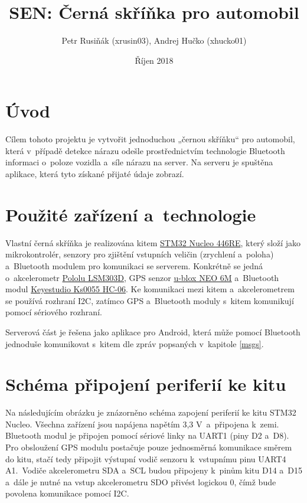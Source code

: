 \documentclass[a4paper,11pt,titlepage]{article}
\title{\textbf{SEN: Černá skříňka pro automobil}}
\author{Petr Rusiňák (xrusin03), Andrej Hučko (xhucko01)}
\date{Říjen 2018}
\begin{document}
\maketitle


\section{Úvod}

Cílem tohoto projektu je vytvořit jednoduchou „černou skříňku“ pro automobil, která
v~případě detekce nárazu odešle prostřednictvím technologie Bluetooth informaci o~poloze vozidla
a~síle nárazu na server. Na serveru je spuštěna aplikace, která tyto získané přijaté údaje
zobrazí.

\section{Použité zařízení a~technologie}

Vlastní černá skříňka je realizována kitem \href{https://www.st.com/en/evaluation-tools/nucleo-f446re.html}{STM32 Nucleo 446RE}, který složí jako mikrokontrolér,
senzory pro zjištění vstupních veličin (zrychlení a~poloha) a~Bluetooth modulem pro komunikaci se serverem.
Konkrétně se jedná o~akcelerometr
\href{https://www.pololu.com/product/2127}{Pololu LSM303D}, GPS senzor \href{https://www.u-blox.com/en/product/neo-6-series}{u-blox NEO 6M} a~Bluetooth modul \href{http://wiki.keyestudio.com/index.php/Ks0055_keyestudio_Bluetooth_Module}{Keyestudio Ks0055 HC-06}.
Ke komunikaci mezi kitem a~akcelerometrem se používá rozhraní I2C, zatímco GPS a~Bluetooth moduly
s~kitem komunikují pomocí sériového rozhraní.

Serverová část je řešena jako aplikace pro Android, která může pomocí Bluetooth jednoduše
komunikovat s~kitem dle zpráv popsaných v~kapitole \ref{msgs}.

\section{Schéma připojení periferií ke kitu}

Na následujícím obrázku je znázorněno schéma zapojení periferií ke kitu STM32 Nucleo.
Všechna zařízení jsou napájena napětím 3,3 V~a~připojena k~zemi. Bluetooth modul
je připojen pomocí sériové linky na UART1 (piny D2 a~D8). Pro obsloužení GPS modulu
postačuje pouze jednosměrná komunikace směrem do kitu, stačí tedy připojit
výstupní vodič senzoru k~vstupnímu pinu UART4 A1.~Vodiče akcelerometru SDA a~SCL
budou připojeny k~pinům kitu D14 a~D15 a~dále je nutné na vstup akcelerometru SDO přivést
logickou 0, čímž bude povolena komunikace pomocí I2C.
\end{document}
